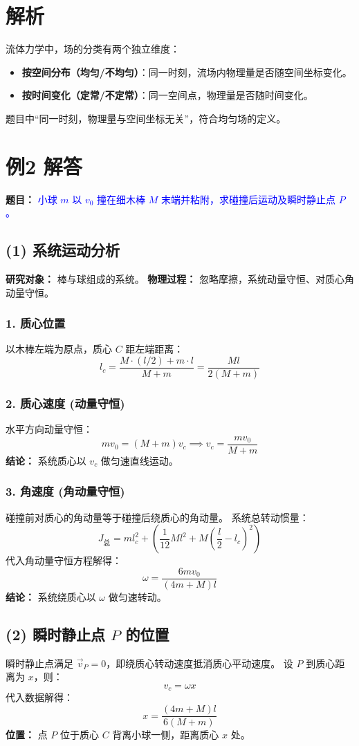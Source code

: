 \documentclass[11pt,a4paper]{article}
\begin{document}
\section*{解析}
流体力学中，场的分类有两个独立维度：
\begin{itemize}
    \item \textbf{按空间分布（均匀/不均匀）}：同一时刻，流场内物理量是否随空间坐标变化。
    \item \textbf{按时间变化（定常/不定常）}：同一空间点，物理量是否随时间变化。
\end{itemize}
题目中“同一时刻，物理量与空间坐标无关”，符合均匀场的定义。


\section*{例2 解答}
\textbf{题目：} \textcolor{blue}{小球 $m$ 以 $v_0$ 撞在细木棒 $M$ 末端并粘附，求碰撞后运动及瞬时静止点 $P$。}

\subsection*{(1) 系统运动分析}
\textbf{研究对象：} 棒与球组成的系统。
\textbf{物理过程：} 忽略摩擦，系统动量守恒、对质心角动量守恒。

\subsubsection*{1. 质心位置}
以木棒左端为原点，质心 $C$ 距左端距离：
\[
l_c = \frac{M \cdot (l/2) + m \cdot l}{M + m} = \frac{Ml}{2(M + m)}
\]

\subsubsection*{2. 质心速度 (动量守恒)}
水平方向动量守恒：
\[
mv_0 = (M + m)v_c \implies \boxed{v_c = \frac{mv_0}{M + m}}
\]
\textbf{结论：} 系统质心以 $v_c$ 做匀速直线运动。

\subsubsection*{3. 角速度 (角动量守恒)}
碰撞前对质心的角动量等于碰撞后绕质心的角动量。
系统总转动惯量：
\[
J_{\text{总}} = ml_c^2 + \left( \frac{1}{12}Ml^2 + M\left(\frac{l}{2} - l_c\right)^2 \right)
\]
代入角动量守恒方程解得：
\[
\boxed{\omega = \frac{6mv_0}{(4m + M)l}}
\]
\textbf{结论：} 系统绕质心以 $\omega$ 做匀速转动。

\subsection*{(2) 瞬时静止点 $P$ 的位置}
瞬时静止点满足 $\vec{v}_P = 0$，即绕质心转动速度抵消质心平动速度。
设 $P$ 到质心距离为 $x$，则：
\[
v_c = \omega x
\]
代入数据解得：
\[
x = \frac{(4m + M)l}{6(M + m)}
\]
\textbf{位置：} 点 $P$ 位于质心 $C$ 背离小球一侧，距离质心 $x$ 处。
\end{document}
